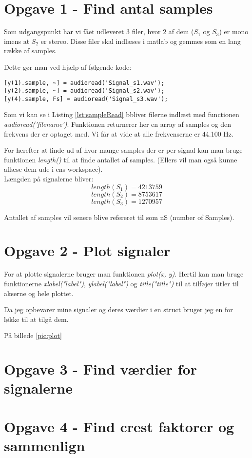\documentclass[../main.tex]{subfiles}
\begin{document}
\section{Opgave 1 - Find antal samples}
Som udgangspunkt har vi fået udleveret 3 filer, hvor 2 af dem ($S_1$ og $S_3$) er mono imens at $S_2$ er stereo.
Disse filer skal indlæses i matlab og gemmes som en lang række af samples.

Dette gør man ved hjælp af følgende kode:

\begin{lstlisting}[caption={Indlæsning af samples fra fil}, label={lst:sampleRead}]
% Loading files into arrays of samples
[y(1).sample, ~] = audioread('Signal_s1.wav');
[y(2).sample, ~] = audioread('Signal_s2.wav');
[y(4).sample, Fs] = audioread('Signal_s3.wav');
\end{lstlisting}
    
Som vi kan se i Listing \ref{lst:sampleRead} bbliver filerne indlæst med functionen \textit{audioread('filename')}.
Funktionen returnerer her en array af samples og den frekvens der er optaget med.
Vi får at vide at alle frekvenserne er 44.100 Hz.

For herefter at finde ud af hvor mange samples der er per signal kan man bruge funktionen \textit{length()} til at finde antallet af samples.
(Ellers vil man også kunne aflæse dem ude i ens workspace). \\
Længden på signalerne bliver:
\[length(S_1) = 4213759\]   
\[length(S_2) = 8753617\]
\[length(S_3) = 1270957\]

Antallet af samples vil senere blive refereret til som nS (number of Samples).

\section{Opgave 2 - Plot signaler}
For at plotte signalerne bruger man funktionen \textit{plot(x, y)}.
Hertil kan man bruge funktionerne \textit{xlabel("label")}, \textit{ylabel("label")} og \textit{title("title")} til at tilføjer titler til akserne og hele plottet.

Da jeg opbevarer mine signaler og deres værdier i en struct bruger jeg en for løkke til at tilgå dem.

På billede \ref{pic:plot}


\section{Opgave 3 - Find værdier for signalerne}



\section{Opgave 4 - Find crest faktorer og sammenlign}
\end{document}
